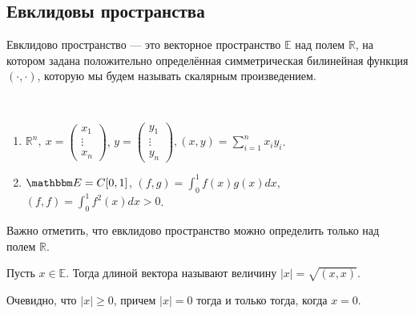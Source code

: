 \subsection*{Евклидовы пространства}
\begin{Def}
	Евклидово пространство --- это векторное пространство $\mathbb{E}$ над полем $\mathbb{R}$, на котором задана положительно определённая симметрическая билинейная функция $(\cdot, \cdot)$, которую мы будем называть скалярным произведением.
\end{Def}
\begin{Examples}\
\begin{enumerate}
\item	$\mathbb{R}^n,\ x = \begin{pmatrix}x_1\\ \vdots\\ x_n\end{pmatrix}$, $y = \begin{pmatrix}y_1\\ \vdots\\ y_n\end{pmatrix}, 
		(x,y) = \sum\limits_{i = 1}^n x_iy_i$.
\item $\E = C[0, 1]$, $(f, g) = \int_{0}^{1}f(x)g(x)dx$, $(f, f) = \int_{0}^{1}f^2(x)dx > 0$.
\end{enumerate}
\end{Examples}
\begin{Comment}
	Важно отметить, что евклидово пространство можно определить только над полем $\mathbb{R}$.
\end{Comment}

\begin{Def}
	Пусть $x\in \mathbb{E}$. Тогда длиной вектора называют величину $|x| = \sqrt{(x,x)}$.
\end{Def}

Очевидно, что $|x| \geqslant 0$, причем $|x| = 0$ тогда и только тогда, когда $x = 0$.

